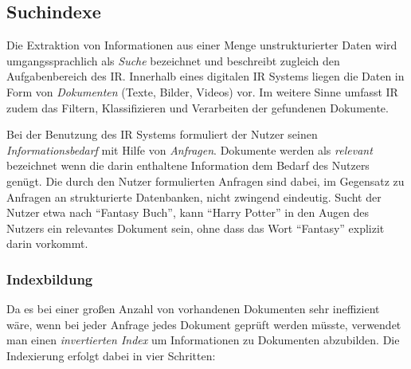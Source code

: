 \subsection{Suchindexe}
\label{sec:search}

Die Extraktion von Informationen aus einer Menge unstrukturierter Daten wird umgangssprachlich als \textit{Suche} bezeichnet und beschreibt zugleich den Aufgabenbereich des \ac{IR}. Innerhalb eines digitalen \acs{IR} Systems liegen die Daten in Form von \textit{Dokumenten} (Texte, Bilder, Videos) vor. Im weitere Sinne umfasst \acs{IR} zudem das Filtern, Klassifizieren und Verarbeiten der gefundenen Dokumente. 

Bei der Benutzung des \acs{IR} Systems formuliert der Nutzer seinen \textit{Informationsbedarf} mit Hilfe von \textit{Anfragen}. Dokumente werden als \textit{relevant} bezeichnet wenn die darin enthaltene Information dem Bedarf des Nutzers genügt. Die durch den Nutzer formulierten Anfragen sind dabei, im Gegensatz zu Anfragen an strukturierte Datenbanken, nicht zwingend eindeutig. Sucht der Nutzer etwa nach ``Fantasy Buch'', kann ``Harry Potter'' in den Augen des Nutzers ein relevantes Dokument sein, ohne dass das Wort ``Fantasy'' explizit darin vorkommt. \citep{Manning2008} %

\subsubsection{Indexbildung}

Da es bei einer großen Anzahl von vorhandenen Dokumenten sehr ineffizient wäre, wenn bei jeder Anfrage jedes Dokument geprüft werden müsste, verwendet man einen \textit{invertierten Index} um Informationen zu Dokumenten abzubilden. Die Indexierung erfolgt dabei in vier Schritten:

